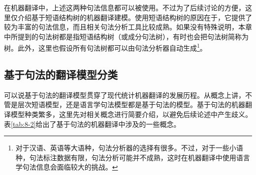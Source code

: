 \parinterval 在机器翻译中，上述这两种句法信息都可以被使用。不过为了后续讨论的方便，这里仅介绍基于短语结构树的机器翻译建模。使用短语结构树的原因在于，它提供了较为丰富的句法信息，而且相关句法分析工具比较成熟。如果没有特殊说明，本章中所提到的句法树都是指短语结构树（或成分句法树），有时也会把句法树简称为树。此外，这里也假设所有句法树都可以由句法分析器自动生成\footnote[7]{对于汉语、英语等大语种，句法分析器的选择有很多。不过，对于一些小语种，句法标注数据有限，句法分析可能并不成熟，这时在机器翻译中使用语言学句法信息会面临较大的挑战。}。


\subsection{基于句法的翻译模型分类}

\parinterval 可以说基于句法的翻译模型贯穿了现代统计机器翻译的发展历程。从概念上讲，不管是层次短语模型，还是语言学句法模型都是基于句法的模型。基于句法的机器翻译模型种类繁多，这里先对相关概念进行简要介绍，以避免后续论述中产生歧义。表\ref{tab:8-2}给出了基于句法的机器翻译中涉及的一些概念。

